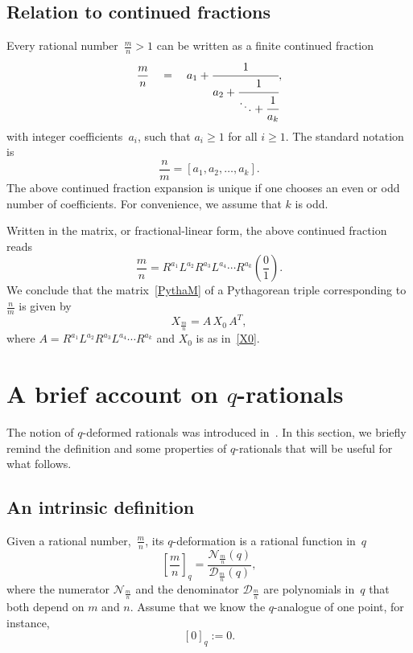 \documentclass{article}[12pt]
\theoremstyle{plain}
\theoremstyle{definition}
\newcommand{\cD}{\mathcal{D}}
\newcommand{\cN}{\mathcal{N}}
\begin{document}
\subsection{Relation to continued fractions}\label{CFSec}

Every rational number~$\frac{m}{n}>1$ can be written as a finite continued fraction
$$
\frac{m}{n}
\quad=\quad
a_1 + \cfrac{1}{a_2
          + \cfrac{1}{\ddots +\cfrac{1}{a_{k}} } },
          $$
with integer coefficients~$a_i$, such that $a_i\geq1$ for all $i\geq1$.
The standard notation is 
$$
\frac{n}{m}=[a_1,a_2,\ldots,a_{k}].
$$
The above continued fraction expansion is unique
if one chooses an even or odd number of coefficients.
For convenience, we assume that $k$ is odd.

Written in the matrix, or fractional-linear form, the above continued fraction reads
\begin{equation}
\label{MCF}
\frac{m}{n}=
R^{a_1}L^{a_2}R^{a_3}L^{a_4}\cdots{}R^{a_k}
\left(\frac{0}{1}\right).
\end{equation}
We conclude that the matrix~\eqref{PythaM} of a Pythagorean triple
corresponding to $\frac{n}{m}$ is given by
\begin{equation}
\label{Matmn}
X_{\frac{m}{n}}=
A\,X_0\,A^T,
\end{equation}
where $A=R^{a_1}L^{a_2}R^{a_3}L^{a_4}\cdots{}R^{a_k}$ and $X_0$ is as in~\eqref{X0}.

\section{A brief account on $q$-rationals}\label{RatSec}

The notion of $q$-deformed rationals was introduced in~\cite{MGOfmsigma}.
In this section, we briefly remind the definition and some properties
of $q$-rationals that will be useful for what follows.

\subsection{An intrinsic definition}

Given a rational number,~$\frac{m}{n}$, its $q$-deformation is a rational function in~$q$
$$
\left[\frac{m}{n}\right]_q=
\frac{\cN_{\frac{m}{n}}(q)}{\cD_{\frac{m}{n}}(q)},
$$
where the numerator $\cN_{\frac{m}{n}}$ and the denominator $\cD_{\frac{m}{n}}$
are polynomials in~$q$ that both depend on $m$ and $n$.
Assume that we know the $q$-analogue
of one point, for instance, 
$$
[0]_q:=0.
$$
\end{document}
